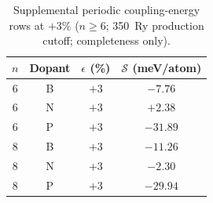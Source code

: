 \begin{table}[t]
\caption{\label{tab:Sgrid_si}Supplemental periodic coupling-energy rows at $+3$\% ($n\geq 6$; 350~Ry production cutoff; completeness only).}
\begin{ruledtabular}
\begin{tabular}{cccc}
$n$ & Dopant & $\epsilon$ (\%) & $\mathcal{S}$ (meV/atom) \\
\hline
6 & B & $+3$ & $-7.76$ \\
6 & N & $+3$ & $+2.38$ \\
6 & P & $+3$ & $-31.89$ \\
8 & B & $+3$ & $-11.26$ \\
8 & N & $+3$ & $-2.30$ \\
8 & P & $+3$ & $-29.94$ \\
\end{tabular}
\end{ruledtabular}
\end{table}
